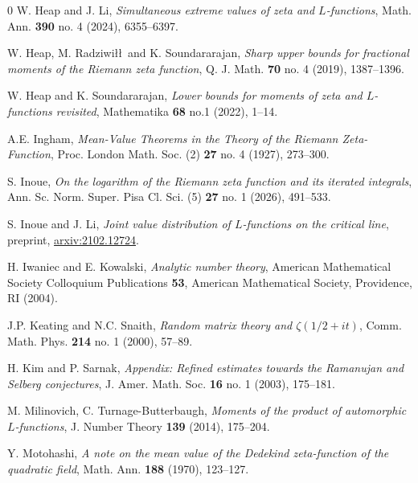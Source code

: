 \documentclass[oneside, 12pt]{amsart}
\theoremstyle{definition}
\begin{document}
\begin{thebibliography}{0}
		 W. Heap and J. Li, \emph{Simultaneous extreme values of zeta and {$L$}-functions}, Math. Ann. {\bf 390} no. 4 (2024), 6355--6397.
		
		 W. Heap, M. Radziwi\l\l\, and K. Soundararajan, \emph{Sharp upper bounds for fractional moments of the {R}iemann zeta function}, Q. J. Math. {\bf 70} no. 4 (2019), 1387--1396.
		
		 W. Heap and K. Soundararajan, \emph{Lower bounds for moments of zeta and {$L$}-functions revisited}, Mathematika {\bf 68} no.1 (2022), 1--14.
		
		
		 A.E. Ingham, \emph{Mean-{V}alue {T}heorems in the {T}heory of the {R}iemann {Z}eta-{F}unction}, Proc. London Math. Soc. (2) {\bf 27} no. 4 (1927), 273--300.
		
		 S. Inoue, \emph{On the logarithm of the {R}iemann zeta function and its
			iterated integrals}, Ann. Sc. Norm. Super. Pisa Cl. Sci. (5) {\bf 27} no. 1 (2026), 491--533.
		
		 S. Inoue and J. Li, \emph{Joint value distribution of {$L$}-functions on the critical line}, preprint, \href{https://arxiv.org/abs/2102.12724}{arxiv:2102.12724}.
		
		 H. Iwaniec and E. Kowalski, \emph{Analytic number theory}, American Mathematical Society Colloquium Publications {\bf 53}, American Mathematical Society, Providence, RI (2004).
		
		 J.P. Keating and N.C. Snaith, \emph{Random matrix theory and {$\zeta(1/2+it)$}}, Comm. Math. Phys. {\bf 214} no. 1 (2000), 57--89.
		
		 H. Kim and P. Sarnak, \emph{Appendix: Refined estimates towards the Ramanujan and Selberg conjectures}, J. Amer. Math. Soc. {\bf 16} no. 1 (2003), 175--181.
		
		 M. Milinovich, C. Turnage-Butterbaugh, \emph{Moments of the product of automorphic $L$-functions}, J. Number Theory {\bf 139} (2014), 175--204.
		
		 Y. Motohashi, \emph{A note on the mean value of the {D}edekind zeta-function of the quadratic field}, Math. Ann. {\bf 188} (1970), 123--127.
		

\end{thebibliography}
\end{document}
